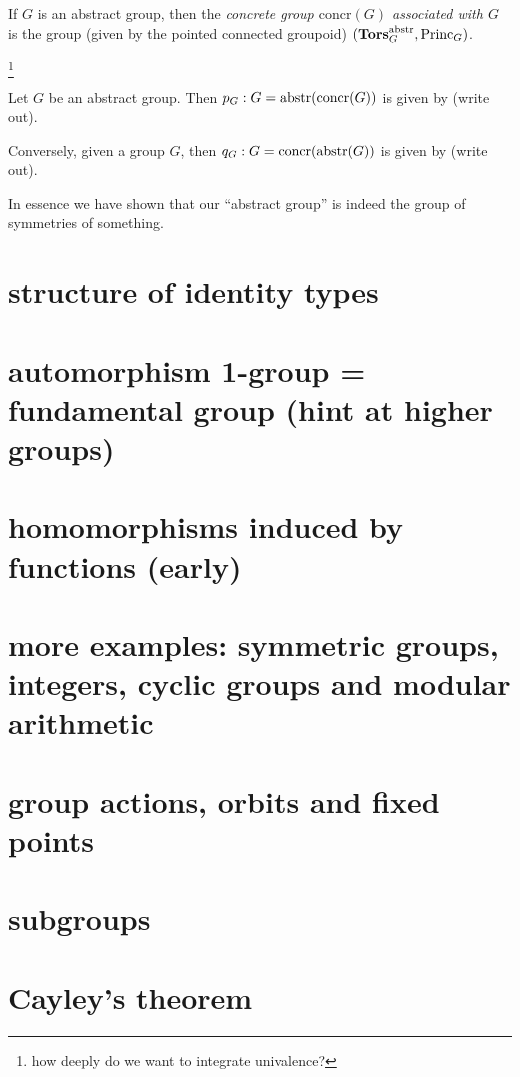 \newcommand{\concr}{\mathrm{concr}}
\begin{definition}
  If $G$ is an abstract group, then the \emph{concrete group $\concr(G)$ associated with $G$} is the group (given by the pointed connected groupoid) $(\mathbf{Tors}_G^{\mathrm{abstr}},\mathrm{Princ}_G)$.
\end{definition}


\footnote{how deeply do we want to integrate univalence?}
\begin{lemma}
  \label{lem:Groupsareidentitytypes}Let $G$ be an abstract group.  Then $p_G:G=\abstr(\concr(G))$ is given by (write out).

Conversely, given a group $G$, then $q_G:G=\concr(\abstr(G))$  is given by (write out).
\end{lemma}
In essence we have shown that our ``abstract group'' is indeed the group of symmetries of something.

\section{structure of identity types}
\section{automorphism 1-group = fundamental group (hint at higher groups)}
\section{homomorphisms induced by functions (early)}
\section{more examples: symmetric groups, integers, cyclic groups and modular arithmetic}
\section{group actions, orbits and fixed points}
\section{subgroups}
\section{Cayley's theorem}
